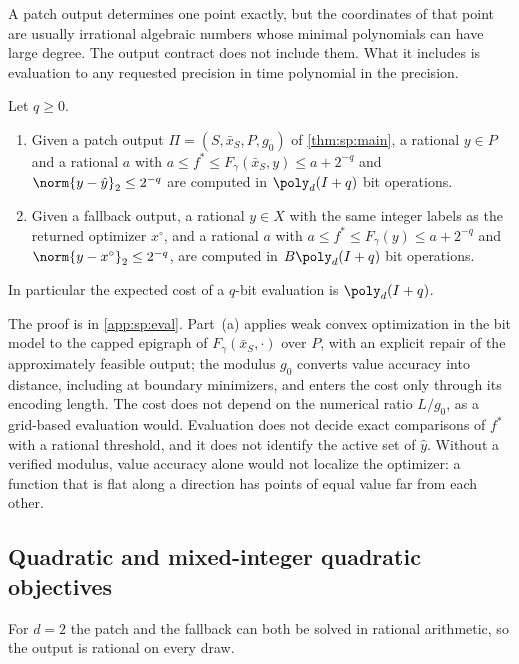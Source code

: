 A patch output determines one point exactly, but the coordinates of that
point are usually irrational algebraic numbers whose minimal polynomials can
have large degree. The output contract does not include them. What it
includes is evaluation to any requested precision in time polynomial in the
precision.

\begin{proposition}[Evaluation]\label{prop:sp:eval}
Let $q\ge0$.
\begin{enumerate}[label=(\alph*)]
\item Given a patch output $\Pi=(S,\bar x_S,P,g_0)$ of \cref{thm:sp:main}, a
rational $y\in P$ and a rational $a$ with
$a\le f^*\le F_\gamma(\bar x_S,y)\le a+2^{-q}$ and
$\norm{y-\hat y}_2\le2^{-q}$ are computed in $\poly_d(I+q)$ bit operations.
\item Given a fallback output, a rational $y\in X$ with the same integer
labels as the returned optimizer $x^\circ$, and a rational $a$ with
$a\le f^*\le F_\gamma(y)\le a+2^{-q}$ and $\norm{y-x^\circ}_2\le2^{-q}$, are
computed in $B\poly_d(I+q)$ bit operations.
\end{enumerate}
In particular the expected cost of a $q$-bit evaluation is $\poly_d(I+q)$.
\end{proposition}

The proof is in \cref{app:sp:eval}. Part~(a) applies weak convex
optimization in the bit model \citep[Definition~2.1.10 and
Corollary~4.2.7]{grotschel1988-geometric-algorithms-and-combinatorial-optimization} to the capped epigraph of
$F_\gamma(\bar x_S,\cdot)$ over $P$, with an explicit repair of the
approximately feasible output; the modulus $g_0$ converts value accuracy
into distance, including at boundary minimizers, and enters the cost only
through its encoding length. The cost does not depend on the numerical ratio
$L/g_0$, as a grid-based evaluation would. Evaluation does not decide exact
comparisons of $f^*$ with a rational threshold, and it does not identify the
active set of $\hat y$. Without a verified modulus, value accuracy alone
would not localize the optimizer: a function that is flat along a direction
has points of equal value far from each other.

\subsection{Quadratic and mixed-integer quadratic objectives}\label{sec:sp:qp}

For $d=2$ the patch and the fallback can both be solved in rational
arithmetic, so the output is rational on every draw.

